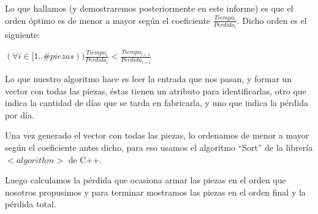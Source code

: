 Lo que hallamos (y demostraremos posteriormente en este informe) es que el orden óptimo es de menor a mayor según el coeficiente $\frac{Tiempo_i}{Perdida_i}$. Dicho orden es el siguiente:

$(\forall i \in [1..\#{piezas})) \frac{Tiempo_i}{Perdida_i} < \frac{Tiempo_{i+1}}{Perdida_{i+1}}$

Lo que nuestro algoritmo hace es leer la entrada que nos pasan, y formar un vector con todas las piezas, éstas tienen un atributo para identificarlas, otro que indica la cantidad de días que se tarda en fabricarla, y uno que indica la pérdida por día.

Una vez generado el vector con todas las piezas, lo ordenamos de menor a mayor según el coeficiente antes dicho, para eso usamos el algoritmo ``Sort'' de la librería \emph{$<algorithm>$} de C++.

Luego calculamos la pérdida que ocasiona armar las piezas en el orden que nosotros propusimos y para terminar mostramos las piezas en el orden final y la pérdida total.
